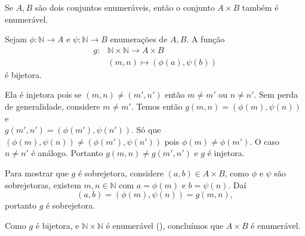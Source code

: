 \documentclass[../main.tex]{subfiles}
\begin{document}
\begin{teo}\label{enum-teo-ABEnumeraveisAxBEnumeravel}
    Se $A, B$ são dois conjuntos enumeráveis, então o conjunto $A \times B$ também é enumerável.
\end{teo}
\begin{dem}
    Sejam $\phi \colon \mathbb{N} \to A$ e $\psi \colon \mathbb{N} \to B$ enumerações de $A,B$. A função 
    \begin{align*}
        g \colon & \mathbb{N} \times \mathbb{N} \to A \times B \\
                 & (m,n) \mapsto (\phi(a),\psi(b))
    \end{align*}
    é bijetora.

    Ela é injetora pois se $(m,n) \neq (m',n')$ então $m \neq m'$ ou $n \neq n'$. Sem perda de generalidade, considere $m \neq m'$.
    Temos então $g(m,n) = (\phi(m),\psi(n))$ e \\ 
    $g(m',n') = (\phi(m'),\psi(n'))$. Só que $(\phi(m),\psi(n)) \neq (\phi(m'),\psi(n'))$ pois 
    $\phi(m) \neq \phi(m')$. O caso $n \neq n'$ é análogo. Portanto $g(m,n) \neq g(m',n')$ e $g$ é injetora.

    Para mostrar que $g$ é sobrejetora, considere $(a,b) \in A \times B$, como $\phi$ e $\psi$ são sobrejetoras, existem $m, n \in \mathbb{N}$ com 
    $a = \phi(m)$ e $b = \psi(n)$. Daí  
    \[ (a,b) = (\phi(m), \psi(n)) = g(m,n), \] 
    portanto $g$ é sobrejetora.

    Como $g$ é bijetora, e $\mathbb{N} \times \mathbb{N}$ é enumerável (), concluímos que $A \times B$ é enumerável.
\end{dem}
\end{document}
